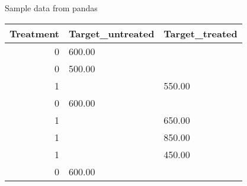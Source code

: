 \caption{Sample data from pandas}
\label{tab:sample_data}
\begin{tabular}{rll}
\toprule
Treatment & Target\_untreated & Target\_treated \\
\midrule
0 & 600.00 &  \\
0 & 500.00 &  \\
1 &  & 550.00 \\
0 & 600.00 &  \\
1 &  & 650.00 \\
1 &  & 850.00 \\
1 &  & 450.00 \\
0 & 600.00 &  \\
\bottomrule
\end{tabular}
